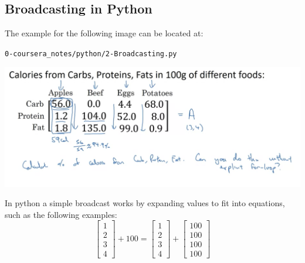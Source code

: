 \documentclass[11pt]{report}
\begin{document}
\subsection{Broadcasting in Python}
The example for the following image can be located at: 
\begin{center}\texttt{0-coursera\_notes/python/2-Broadcasting.py}
\end{center}
\begin{center}
\includegraphics[width=0.9\linewidth]{Broadcast.png} 
\end{center}
In python a simple broadcast works by expanding values to fit into equations, such as the following examples:\\
\begin{equation*}
    \begin{bmatrix}
        1\\2\\3\\4
    \end{bmatrix}
    + 100 = 
    \begin{bmatrix}
        1\\2\\3\\4
    \end{bmatrix}
  + 
    \begin{bmatrix}
        100\\100\\100\\100
    \end{bmatrix}
\end{equation*}
\end{document}
